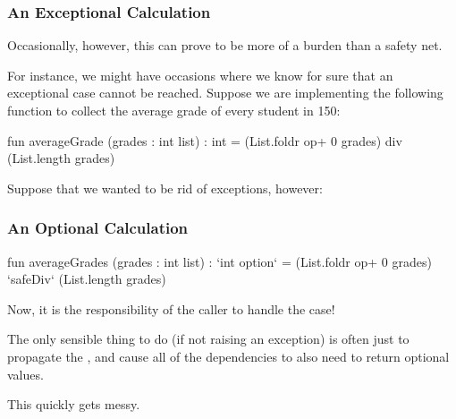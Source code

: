 \documentclass[aspectratio=169]{beamer}
\begin{document}
\begin{frame}[fragile]
  \frametitle{An Exceptional Calculation}

  Occasionally, however, this can prove to be more of a burden than a
  safety net.

  \vspace{\fill}

  For instance, we might have occasions where we know for sure that
  an exceptional case cannot be reached. Suppose we are implementing
  the following function to collect the average grade of every 
  student in 150:
  
  \begin{codeblock}
    fun averageGrade (grades : int list) : int =
      (List.foldr op+ 0 grades)
      div
      (List.length grades)
  \end{codeblock}

  \vspace{\fill}

  Suppose that we wanted to be rid of exceptions, however:
\end{frame}

\begin{frame}[fragile]
  \frametitle{An Optional Calculation}

  \begin{codeblock}
    fun averageGrades (grades : int list) : `int option` =
      (List.foldr op+ 0 grades)
      `safeDiv`
      (List.length grades)
  \end{codeblock}

  Now, it is the responsibility of the caller to handle the  case!

  \vspace{\fill}

  The only sensible thing to do (if not raising an exception) is often just to
  propagate the , and cause all of the dependencies to also need
  to return optional values. 

  \vspace{\fill}

  This quickly gets messy.
\end{frame}
\end{document}
